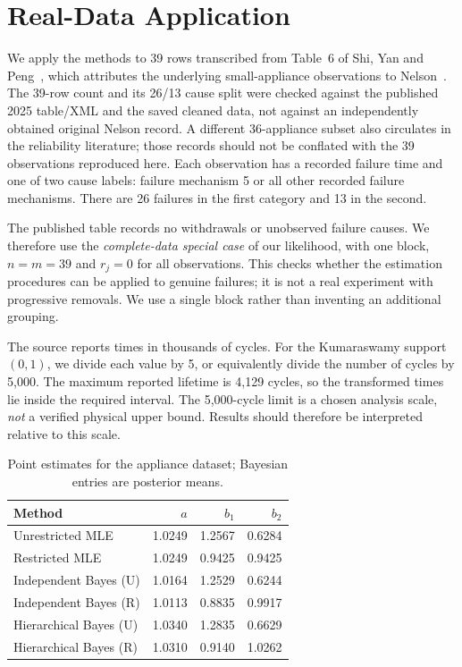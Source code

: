 \documentclass[a4paper,11pt]{article}
\begin{document}
\section{Real-Data Application}\label{sec:real-data}
We apply the methods to 39 rows transcribed from Table~6 of Shi, Yan and Peng~\cite{shi2025}, which attributes the underlying small-appliance observations to Nelson~\cite{nelson1982}. The 39-row count and its 26/13 cause split were checked against the published 2025 table/XML and the saved cleaned data, not against an independently obtained original Nelson record. A different 36-appliance subset also circulates in the reliability literature; those records should not be conflated with the 39 observations reproduced here. Each observation has a recorded failure time and one of two cause labels: failure mechanism 5 or all other recorded failure mechanisms. There are 26 failures in the first category and 13 in the second.

The published table records no withdrawals or unobserved failure causes. We therefore use the \emph{complete-data special case} of our likelihood, with one block, $n=m=39$ and $r_j=0$ for all observations. This checks whether the estimation procedures can be applied to genuine failures; it is not a real experiment with progressive removals. We use a single block rather than inventing an additional grouping.

The source reports times in thousands of cycles. For the Kumaraswamy support $(0,1)$, we divide each value by 5, or equivalently divide the number of cycles by 5,000. The maximum reported lifetime is 4,129 cycles, so the transformed times lie inside the required interval. The 5,000-cycle limit is a chosen analysis scale, \emph{not} a verified physical upper bound. Results should therefore be interpreted relative to this scale.

\begin{table}[htbp]
\centering\small
\caption{Point estimates for the appliance dataset; Bayesian entries are posterior means.}\label{tab:real-parameter}
\begin{tabular}{lrrr}\hline
Method & $a$ & $b_1$ & $b_2$\\\hline
Unrestricted MLE & 1.0249 & 1.2567 & 0.6284\\
Restricted MLE & 1.0249 & 0.9425 & 0.9425\\
Independent Bayes (U) & 1.0164 & 1.2529 & 0.6244\\
Independent Bayes (R) & 1.0113 & 0.8835 & 0.9917\\
Hierarchical Bayes (U) & 1.0340 & 1.2835 & 0.6629\\
Hierarchical Bayes (R) & 1.0310 & 0.9140 & 1.0262\\\hline
\end{tabular}
\end{table}
\end{document}
